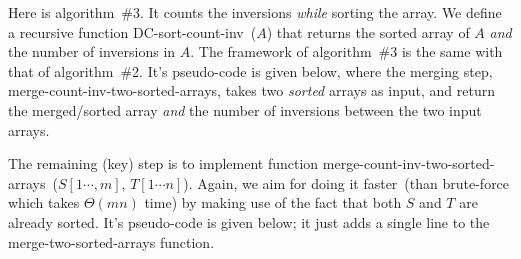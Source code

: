 Here is algorithm~\#3. It counts the inversions \emph{while} sorting the array.
We define a recursive function DC-sort-count-inv~($A$) that returns the sorted array of $A$ \emph{and}
the number of inversions in $A$. The framework of algorithm~\#3 is the same with that of algorithm~\#2. 
It's pseudo-code is given below, where the merging step, merge-count-inv-two-sorted-arrays, takes two \emph{sorted} arrays
as input, and return the merged/sorted array \emph{and} the number of inversions between the two input arrays.

\begin{algorithmblock}[0.8\textwidth]
	\xxx
	\xxx
	\xxx
	\xxx
	\xxx
	\xxx
\end{algorithmblock}

The remaining (key) step is to implement function merge-count-inv-two-sorted-arrays~($S[1\cdots, m]$, $T[1\cdots n]$).
Again, we aim for doing it faster~(than brute-force which takes $\Theta(mn)$ time) by making use of the fact that
both $S$ and $T$ are already sorted. It's pseudo-code is given below; it just adds a single line to the merge-two-sorted-arrays function.

\begin{algorithmblock}[0.8\textwidth]
        \xxx
        \xxx
        \xxx
        \aab {\textcolor{blue}{init inv = 0;}}\xxx
        \xxx
        \xxx
        \xxx
        \xxx
        \xxx
        \xxx
        \xxx
        \xxx
        \aad {\textcolor{blue}{inv = inv + $(m-i+1)$};}\xxx
        \aab {\textcolor{blue}{return $(C, inv)$};}\xxx
\end{algorithmblock}


